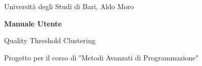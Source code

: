\documentclass[12pt,a4paper,oneside]{report}
\begin{document}
\hypersetup{pageanchor=false}
\begin{titlepage}
  \centering
  {\Large Università degli Studi di Bari, Aldo Moro\par}
  \vspace{2.5cm}
  {\Huge \bfseries Manuale Utente\par}
  \vspace{0.6cm}
  {\LARGE Quality Threshold Clustering\par}
  \vspace{2cm}
  {\large Progetto per il corso di "Metodi Avanzati di Programmazione"\par}
  \vfill
  {\large \par}
\end{titlepage}
\clearpage
\hypersetup{pageanchor=true}

\tableofcontents
\clearpage
{}
\listoffigures
\clearpage









\end{document}
